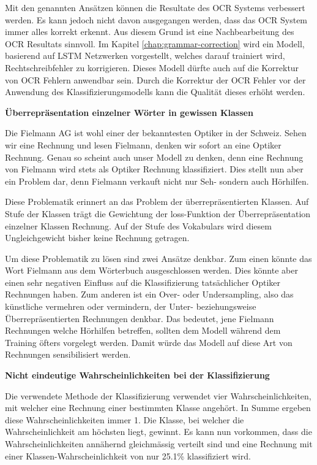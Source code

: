Mit den genannten Ansätzen können die Resultate des OCR Systems verbessert werden. Es kann jedoch nicht davon ausgegangen werden, dass das OCR System immer alles korrekt erkennt. Aus diesem Grund ist eine Nachbearbeitung des OCR Resultats sinnvoll. Im Kapitel \ref{chap:grammar-correction} wird ein Modell, basierend auf LSTM Netzwerken vorgestellt, welches darauf trainiert wird, Rechtschreibfehler zu korrigieren. Dieses Modell dürfte auch auf die Korrektur von OCR Fehlern anwendbar sein. Durch die Korrektur der OCR Fehler vor der Anwendung des Klassifizierungsmodells kann die Qualität dieses erhöht werden.

{\parindent=0pt
\textbf{Überrepräsentation einzelner Wörter in gewissen Klassen}}

Die Fielmann AG ist wohl einer der bekanntesten Optiker in der Schweiz. Sehen wir eine Rechnung und lesen Fielmann, denken wir sofort an eine Optiker Rechnung. Genau so scheint auch unser Modell zu denken, denn eine Rechnung von Fielmann wird stets als Optiker Rechnung klassifiziert. Dies stellt nun aber ein Problem dar, denn Fielmann verkauft nicht nur Seh- sondern auch Hörhilfen.

Diese Problematik erinnert an das Problem der überrepräsentierten Klassen. Auf Stufe der Klassen trägt die Gewichtung der loss-Funktion der Überrepräsentation einzelner Klassen Rechnung. Auf der Stufe des Vokabulars wird diesem Ungleichgewicht bisher keine Rechnung getragen.

Um diese Problematik zu lösen sind zwei Ansätze denkbar. Zum einen könnte das Wort Fielmann aus dem Wörterbuch ausgeschlossen werden. Dies könnte aber einen sehr negativen Einfluss auf die Klassifizierung tatsächlicher Optiker Rechnungen haben. Zum anderen ist ein Over- oder Undersampling, also das künstliche vermehren oder vermindern, der Unter- beziehungsweise Überrepräsentierten Rechnungen denkbar. Das bedeutet, jene Fielmann Rechnungen welche Hörhilfen betreffen, sollten dem Modell während dem Training öfters vorgelegt werden. Damit würde das Modell auf diese Art von Rechnungen sensibilisiert werden.

{\parindent=0pt
\textbf{Nicht eindeutige Wahrscheinlichkeiten bei der Klassifizierung}}

Die verwendete Methode der Klassifizierung verwendet vier Wahrscheinlichkeiten, mit welcher eine Rechnung einer bestimmten Klasse angehört. In Summe ergeben diese Wahrscheinlichkeiten immer 1. Die Klasse, bei welcher die Wahrscheinlichkeit am höchsten liegt, gewinnt. Es kann nun vorkommen, dass die Wahrscheinlichkeiten annähernd gleichmässig verteilt sind und eine Rechnung mit einer Klassen-Wahrscheinlichkeit von nur 25.1\% klassifiziert wird.

